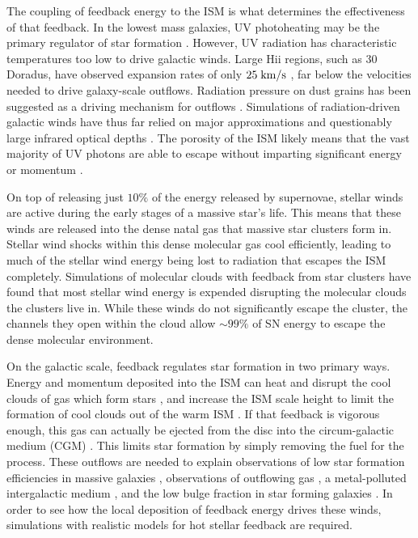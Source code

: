 The coupling of feedback energy to the ISM is what determines the effectiveness
of that feedback.  In the lowest mass galaxies, UV photoheating may be the
primary regulator of star formation \citep{Efstathiou1992}.    However, UV
radiation has characteristic temperatures too low to drive galactic winds.
Large {\sc Hii} regions, such as 30 Doradus, have observed expansion rates of
only $25\;\rm{km/s}$ \citep{Chu1994}, far below the velocities needed to drive
galaxy-scale outflows.  Radiation pressure on dust grains has been suggested as
a driving mechanism for outflows \citep{Murray2011}.  Simulations of
radiation-driven galactic winds have thus far relied on major approximations
\citep{Roskar2014,Agertz2015} and questionably large infrared optical depths
\citep{Hopkins2014}.  The porosity of the ISM likely means that the vast
majority of UV photons are able to escape without imparting significant energy
or momentum \citep{Dale2005,Walch2012,Krumholz2013}.

On top of releasing just $10\%$ of the energy released by supernovae, stellar
winds are active during the early stages of a massive star's life.  This means
that these winds are released into the dense natal gas that massive star
clusters form in.  Stellar wind shocks within this dense molecular gas cool
efficiently, leading to much of the stellar wind energy being lost to radiation
that escapes the ISM completely.  Simulations of molecular clouds with feedback
from star clusters \citep{Gendelev2012,Rogers2013} have found that most stellar
wind energy is expended disrupting the molecular clouds the clusters live in.
While these winds do not significantly escape the cluster, the channels they
open within the cloud allow $\sim99\%$ of SN energy to escape the dense
molecular environment.

On the galactic scale, feedback regulates star formation in two primary ways.
Energy and momentum deposited into the ISM can heat and disrupt the cool clouds
of gas which form stars \citep{Rogers2013}, and increase the ISM scale height to
limit the formation of cool clouds out of the warm ISM
\citep{Ostriker2010,Benincasa2016}.  If that feedback is vigorous enough, this
gas can actually be ejected from the disc into the circum-galactic medium (CGM)
\citep{Larson1974,Heckman1987,Hopkins2012b}.  This limits star formation by
simply removing the fuel for the process.  These outflows are needed to explain
observations of low star formation efficiencies in massive galaxies
\citep{Behroozi2013,Moster2013}, observations of outflowing gas
\citep{Lynds1963,Heckman1987}, a metal-polluted intergalactic medium
\citep{Shen2010}, and the low bulge fraction in star forming galaxies
\citep{Brook2012}.  In order to see how the local deposition of feedback energy
drives these winds, simulations with realistic models for hot stellar feedback
are required.


